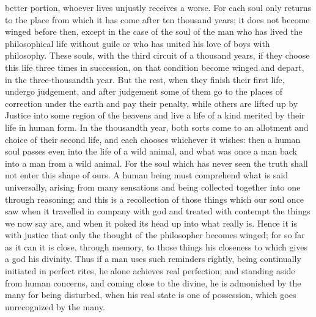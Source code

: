 better portion, whoever lives  unjustly receives a worse. For
each soul only returns to the place from which it has come after ten
thousand years; it
 does not become winged before then, except in the case of the
soul of the man who has lived the philosophical life without guile or
who has united his love of boys with philosophy. These souls, with the
third circuit of a thousand years, if they choose this life three times
in succession, on that condition become winged and depart, in the
three-thousandth year. But the rest,  when they finish their
first life, undergo judgement, and after judgement some of them go to
the places of correction under the earth and pay their penalty, while
others are lifted up by Justice into some region of the heavens and live
a life of a kind merited by their life in human
form. In the thousandth
year,  both sorts come to an allotment and
choice of their second
life, and each chooses whichever it wishes: then a human soul passes
even into the life of a wild animal, and what was once a  man
back into a man from a wild animal. For the soul which has never seen
the truth shall not enter this shape of ours. A human being must
comprehend what is said universally, arising  from many
sensations and being collected together into one through reasoning; and
this is a recollection
of those things which our soul once saw when it travelled in company
with god and treated with contempt the things we now say
are, and when it poked
its head up into what really is. Hence it is  with justice that
only the thought of the philosopher becomes winged; for so far as it can
it is close, through memory, to those things his closeness to which
gives a god his divinity. Thus if a man uses such
reminders rightly, being
continually initiated in perfect rites, he alone achieves real
perfection; and standing
 aside from human concerns, and coming close to the divine, he
is admonished by the many for being disturbed, when his real state is
one of possession, which goes unrecognized by the many.


